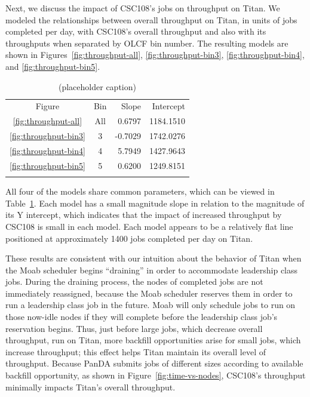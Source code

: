 Next, we discuss the impact of CSC108's jobs on throughput on Titan. We modeled
the relationships between overall throughput on Titan, in units of jobs
completed per day, with CSC108's overall throughput and also with its
throughputs when separated by OLCF bin number. The resulting models are shown
in Figures~\ref{fig:throughput-all}, \ref{fig:throughput-bin3},
\ref{fig:throughput-bin4}, and \ref{fig:throughput-bin5}.

\begin{table}
\caption{(placeholder caption)}
\label{tab:throughput-params}       %
\begin{tabular}{ccrr}
\hline\noalign{\smallskip}
Figure  &   Bin & Slope   & Intercept   \\
\noalign{\smallskip}\hline\noalign{\smallskip}
\ref{fig:throughput-all}    &   All &   0.6797  &   1184.1510   \\
\ref{fig:throughput-bin3}   &   3   &  -0.7029  &   1742.0276   \\
\ref{fig:throughput-bin4}   &   4   &   5.7949  &   1427.9643   \\
\ref{fig:throughput-bin5}   &   5   &   0.6200  &   1249.8151   \\
\noalign{\smallskip}\hline
\end{tabular}
\end{table}

All four of the models share common parameters, which can be viewed in
Table~\ref{tab:throughput-params}. Each model has a small magnitude slope in
relation to the magnitude of its Y intercept, which indicates that the impact
of increased throughput by CSC108 is small in each model. Each model appears to
be a relatively flat line positioned at approximately 1400 jobs completed per
day on Titan.

These results are consistent with our intuition about the behavior of Titan
when the Moab scheduler begins ``draining'' in order to accommodate leadership
class jobs. During the draining process, the nodes of completed jobs are not
immediately reassigned, because the Moab scheduler reserves them in order to
run a leadership class job in the future. Moab will only schedule jobs to run
on those now-idle nodes if they will complete before the leadership class job's
reservation begins. Thus, just before large jobs, which decrease overall
throughput, run on Titan, more backfill opportunities arise for small jobs,
which increase throughput; this effect helps Titan maintain its overall level
of throughput. Because PanDA submits jobs of different sizes according to
available backfill opportunity, as shown in Figure~\ref{fig:time-vs-nodes},
CSC108's throughput minimally impacts Titan's overall throughput.

